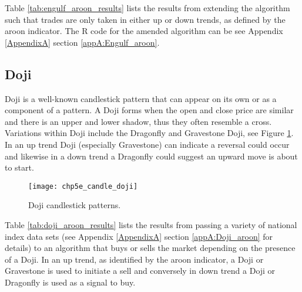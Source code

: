 

Table \ref{tab:engulf_aroon_results} lists the results from extending the algorithm such that trades are only taken in either up or down trends, as defined by the aroon indicator. The R code for the amended algorithm can be see Appendix \ref{AppendixA} section \ref{appA:Engulf_aroon}.



\subsection{Doji}
Doji is a well-known candlestick pattern that can appear on its own or as a component of a pattern. A Doji forms when the open and close price are similar and there is an upper and lower shadow, thus they often resemble a cross. Variations within Doji include the Dragonfly and Gravestone Doji, see Figure \ref{fig:chp5e:doji}. In an up trend Doji (especially Gravestone) can indicate a reversal could occur and likewise in a down trend a Dragonfly could suggest an upward move is about to start.

\begin{figure}[tbph]
\centering
\texttt{[image: chp5e\_candle\_doji]}
\caption[Doji candlestick patterns]{Doji candlestick patterns.}
\label{fig:chp5e:doji}
\end{figure}

Table \ref{tab:doji_aroon_results} lists the results from passing a variety of national index data sets (see Appendix \ref{AppendixA} section \ref{appA:Doji_aroon} for details) to an algorithm that buys or sells the market depending on the presence of a Doji. In an up trend, as identified by the aroon indicator, a Doji or Gravestone is used to initiate a sell and conversely in down trend a Doji or Dragonfly is used as a signal to buy.


 
